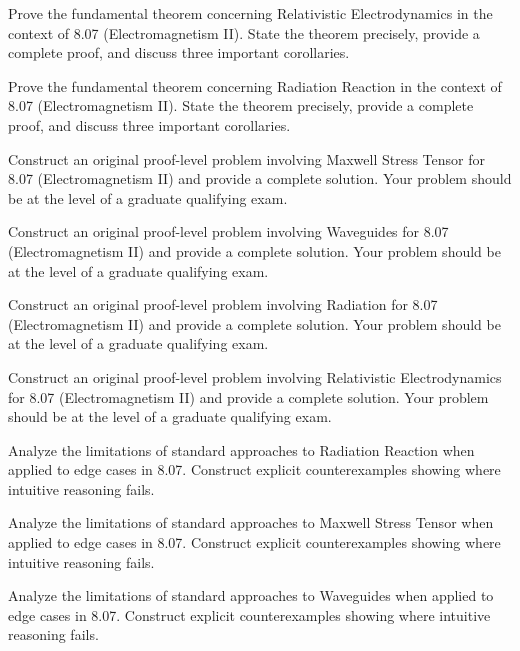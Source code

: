 \documentclass[12pt,a4paper]{exam}
\begin{document}
\begin{questions}
\vspace{0.3cm}

\question[6]
Prove the fundamental theorem concerning Relativistic Electrodynamics in the context of 8.07 (Electromagnetism II). State the theorem precisely, provide a complete proof, and discuss three important corollaries.

\vspace{0.3cm}

\question[6]
Prove the fundamental theorem concerning Radiation Reaction in the context of 8.07 (Electromagnetism II). State the theorem precisely, provide a complete proof, and discuss three important corollaries.

\vspace{0.3cm}

\question[7]
Construct an original proof-level problem involving Maxwell Stress Tensor for 8.07 (Electromagnetism II) and provide a complete solution. Your problem should be at the level of a graduate qualifying exam.

\vspace{0.3cm}

\question[3]
Construct an original proof-level problem involving Waveguides for 8.07 (Electromagnetism II) and provide a complete solution. Your problem should be at the level of a graduate qualifying exam.

\vspace{0.3cm}

\question[4]
Construct an original proof-level problem involving Radiation for 8.07 (Electromagnetism II) and provide a complete solution. Your problem should be at the level of a graduate qualifying exam.

\vspace{0.3cm}

\question[5]
Construct an original proof-level problem involving Relativistic Electrodynamics for 8.07 (Electromagnetism II) and provide a complete solution. Your problem should be at the level of a graduate qualifying exam.

\vspace{0.3cm}

\question[3]
Analyze the limitations of standard approaches to Radiation Reaction when applied to edge cases in 8.07. Construct explicit counterexamples showing where intuitive reasoning fails.

\vspace{0.3cm}

\question[7]
Analyze the limitations of standard approaches to Maxwell Stress Tensor when applied to edge cases in 8.07. Construct explicit counterexamples showing where intuitive reasoning fails.

\vspace{0.3cm}

\question[3]
Analyze the limitations of standard approaches to Waveguides when applied to edge cases in 8.07. Construct explicit counterexamples showing where intuitive reasoning fails.

\vspace{0.3cm}

\end{questions}
\end{document}
